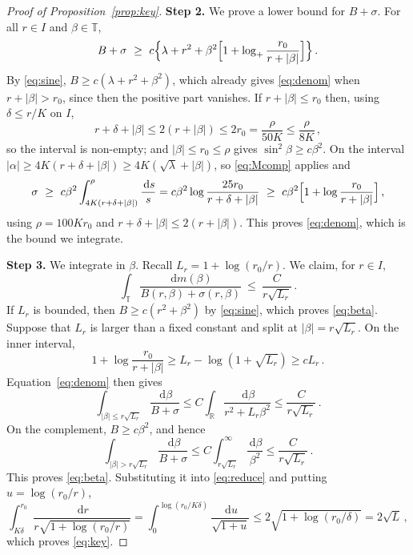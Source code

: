 \documentclass[11pt]{amsart}
\theoremstyle{plain}
\theoremstyle{definition}
\newcommand{\R}{\mathbb R}
\newcommand{\T}{\mathbb T}
\newcommand{\1}{\mathbf 1}
\newcommand{\abs}[1]{\lvert #1\rvert}
\newcommand{\dd}{\,\mathrm d}
\begin{document}
\begin{proof}[Proof of Proposition~\ref{prop:key}]
\medskip
\noindent\textbf{Step 2.}  We prove a lower bound for $B+\sigma$.  For all
$r\in I$ and $\beta\in\T$,
\begin{equation}\label{eq:denom}
  B+\sigma\ \geq\ c\Bigl\{\lambda+r^2+\beta^2
   \Bigl[1+\log_+\frac{r_0}{r+\abs\beta}\Bigr]\Bigr\}\, .
\end{equation}
By \eqref{eq:sine}, $B\geq c(\lambda+r^2+\beta^2)$, which already gives
\eqref{eq:denom} when $r+\abs\beta>r_0$, since then the positive part
vanishes.  If $r+\abs\beta\leq r_0$ then, using $\delta\leq r/K$ on $I$,
\[
  r+\delta+\abs\beta\leq2(r+\abs\beta)\leq2r_0=\frac\rho{50K}\leq\frac\rho{8K}\, ,
\]
so the interval is non-empty; and $\abs\beta\leq r_0\leq\rho$ gives
$\sin^2\beta\geq c\beta^2$.  On the interval
$\abs\alpha\geq4K(r+\delta+\abs\beta)\geq4K(\sqrt\lambda+\abs\beta)$, so
\eqref{eq:Mcomp} applies and
\[
  \sigma\ \geq\ c\beta^2\int_{4K(r+\delta+\abs\beta)}^{\rho}\frac{\dd s}s
  = c\beta^2\log\frac{25r_0}{r+\delta+\abs\beta}
  \ \geq\ c\beta^2\Bigl[1+\log\frac{r_0}{r+\abs\beta}\Bigr]\, ,
\]
using $\rho=100Kr_0$ and $r+\delta+\abs\beta\leq2(r+\abs\beta)$.  This proves
\eqref{eq:denom}, which is the bound we integrate.

\medskip
\noindent\textbf{Step 3.}  We integrate in $\beta$.
Recall $L_r=1+\log(r_0/r)$.  We claim, for
$r\in I$,
\begin{equation}\label{eq:beta}
  \int_\T\frac{\dd m(\beta)}{B(r,\beta)+\sigma(r,\beta)}\ \leq\ \frac C{r\sqrt{L_r}}\, .
\end{equation}
If $L_r$ is bounded, then $B\geq c(r^2+\beta^2)$ by \eqref{eq:sine}, which
proves \eqref{eq:beta}.  Suppose that $L_r$ is larger than a fixed constant
and split at $\abs\beta=r\sqrt{L_r}$.  On the inner interval,
\[
  1+\log\frac{r_0}{r+\abs\beta}
  \geq L_r-\log(1+\sqrt{L_r})\geq cL_r\, .
\]
Equation~\eqref{eq:denom} then gives
\[
  \int_{\abs\beta\leq r\sqrt{L_r}}
  \frac{\dd\beta}{B+\sigma}
  \leq C\int_\R\frac{\dd\beta}{r^2+L_r\beta^2}
  \leq\frac C{r\sqrt{L_r}}\, .
\]
On the complement, $B\geq c\beta^2$, and hence
\[
  \int_{\abs\beta>r\sqrt{L_r}}
  \frac{\dd\beta}{B+\sigma}
  \leq C\int_{r\sqrt{L_r}}^\infty\frac{\dd\beta}{\beta^2}
  \leq\frac C{r\sqrt{L_r}}\, .
\]
This proves \eqref{eq:beta}.
Substituting it into \eqref{eq:reduce} and putting $u=\log(r_0/r)$,
\[
  \int_{K\delta}^{r_0}\frac{\dd r}{r\sqrt{1+\log(r_0/r)}}
  =\int_0^{\log(r_0/K\delta)}\frac{\dd u}{\sqrt{1+u}}
  \leq2\sqrt{1+\log(r_0/\delta)}=2\sqrt L\, ,
\]
which proves \eqref{eq:key}.
\end{proof}
\end{document}
